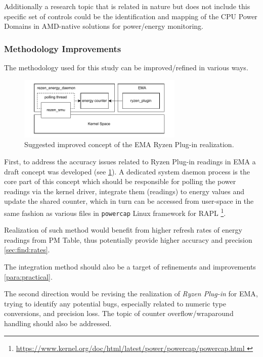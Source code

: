 Additionally a research topic that is related in nature but does not include
this specific set of controls could be the identification and mapping of the
\gls{CPU} Power Domains in AMD-native solutions for power/energy monitoring. 

\subsubsection{Methodology Improvements}

The methodology used for this study can be improved/refined in various ways.

\begin{figure}[h]
    \centering
    \includegraphics[width=0.7\textwidth]{assets/methodology_improved_concept}
    \caption{
      Suggested improved concept of the \gls{EMA} Ryzen Plug-in realization.
    }
    \label{fig:method}
\end{figure}

First, to address the accuracy issues related to Ryzen Plug-in readings in
\gls{EMA} a draft concept was developed (see \cref{fig:method}). A dedicated
system daemon process is the core part of this concept which should be
responsible for polling the power readings via the kernel driver, integrate
them (readings) to energy values and update the shared counter, which in
turn can be accessed from user-space in the same fashion as various files in
\texttt{powercap} Linux framework for \gls{RAPL} \footnote{\url{
  https://www.kernel.org/doc/html/latest/power/powercap/powercap.html
}}.

Realization of such method would benefit from higher refresh rates of energy
readings from \gls{PM} Table, thus potentially provide higher accuracy and
precision \cref{sec:find:rates}.

The integration method should also be a target of refinements and
improvements \cref{para:practical}.

The second direction would be revising the realization of \emph{Ryzen Plug-in}
for \gls{EMA}, trying to identify any potential bugs, especially related
to numeric type conversions, and precision loss. The topic of counter
overflow/wraparound handling should also be addressed.
